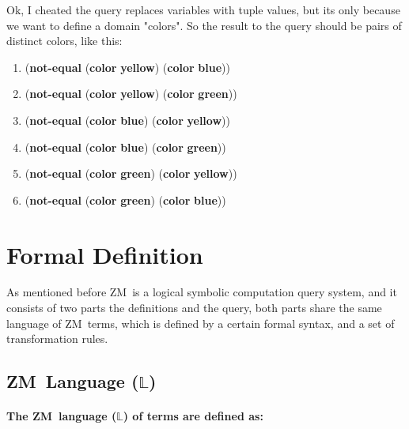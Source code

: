 \documentclass[11pt,a4paper]{report}
\newcommand{\zm}{ZM}
\newcommand{\zconst}[1]{\textbf{#1}}
\newcommand{\ztuple}[1]{(#1)}
\newcommand{\zexample}[1]{\begin{center} #1 \end{center}}
\begin{document}
    Ok, I cheated the query replaces variables with tuple values, but its only because we want to define a domain "colors". 
    So the result to the query should be pairs of distinct colors, like this:
    
    \zexample{
        \begin{enumerate}
            \item \ztuple{\zconst{not-equal} \ztuple{\zconst{color} \zconst{yellow}} \ztuple{\zconst{color} \zconst{blue}}}
            \item \ztuple{\zconst{not-equal} \ztuple{\zconst{color} \zconst{yellow}} \ztuple{\zconst{color} \zconst{green}}}
            \item \ztuple{\zconst{not-equal} \ztuple{\zconst{color} \zconst{blue}} \ztuple{\zconst{color} \zconst{yellow}}}
            \item \ztuple{\zconst{not-equal} \ztuple{\zconst{color} \zconst{blue}} \ztuple{\zconst{color} \zconst{green}}}
            \item \ztuple{\zconst{not-equal} \ztuple{\zconst{color} \zconst{green}} \ztuple{\zconst{color} \zconst{yellow}}}
            \item \ztuple{\zconst{not-equal} \ztuple{\zconst{color} \zconst{green}} \ztuple{\zconst{color} \zconst{blue}}}
        \end{enumerate}
    }

\section{Formal Definition}

As mentioned before \zm\ is a logical symbolic computation query system, and it consists of two parts
the definitions and the query, both parts share the same language of \zm\ terms, which is defined by
a certain formal syntax, and a set of transformation rules.

\subsection{\zm\ Language ($\mathbb{L}$)}
\paragraph{The \zm\ language ($\mathbb{L}$) of terms are defined as:}
\end{document}
